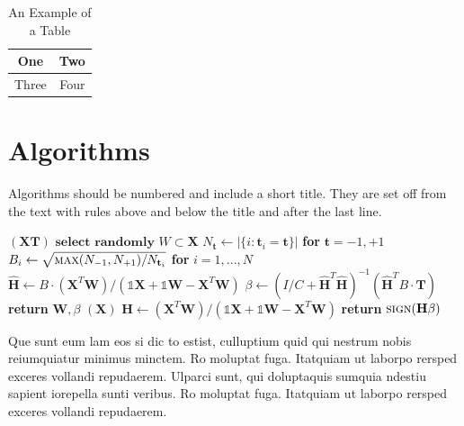 \documentclass[lettersize,journal]{IEEEtran}
\begin{document}
\begin{table}[!t]
\caption{An Example of a Table\label{tab:table1}}
\centering
\begin{tabular}{|c||c|}
\hline
One & Two\\
\hline
Three & Four\\
\hline
\end{tabular}
\end{table}

\section{Algorithms}
Algorithms should be numbered and include a short title. They are set off from the text with rules above and below the title and after the last line.

\begin{algorithm}[H]
\caption{Weighted Tanimoto ELM.}\label{alg:alg1}
\begin{algorithmic}
\STATE
{}$(\mathbf{X} \mathbf{T})$
\STATE \hspace{0.5cm}$ \textbf{select randomly } W \subset \mathbf{X}  $
\STATE \hspace{0.5cm}$ N_\mathbf{t} \gets | \{ i : \mathbf{t}_i = \mathbf{t} \} | $ \textbf{ for } $ \mathbf{t}= -1,+1 $
\STATE \hspace{0.5cm}$ B_i \gets \sqrt{ \textsc{max}(N_{-1},N_{+1}) / N_{\mathbf{t}_i} } $ \textbf{ for } $ i = 1,...,N $
\STATE \hspace{0.5cm}$ \hat{\mathbf{H}} \gets  B \cdot (\mathbf{X}^T\textbf{W})/( \mathbb{1}\mathbf{X} + \mathbb{1}\textbf{W} - \mathbf{X}^T\textbf{W} ) $
\STATE \hspace{0.5cm}$ \beta \gets \left ( I/C + \hat{\mathbf{H}}^T\hat{\mathbf{H}} \right )^{-1}(\hat{\mathbf{H}}^T B\cdot \mathbf{T})  $
\STATE \hspace{0.5cm}\textbf{return}  $\textbf{W},  \beta $
\STATE
{}$(\mathbf{X} )$
\STATE \hspace{0.5cm}$ \mathbf{H} \gets  (\mathbf{X}^T\textbf{W} )/( \mathbb{1}\mathbf{X}  + \mathbb{1}\textbf{W}- \mathbf{X}^T\textbf{W}  ) $
\STATE \hspace{0.5cm}\textbf{return}  $\textsc{sign}( \mathbf{H} \beta )$
\end{algorithmic}
\label{alg1}
\end{algorithm}

Que sunt eum lam eos si dic to estist, culluptium quid qui nestrum nobis reiumquiatur minimus minctem. Ro moluptat fuga. Itatquiam ut laborpo rersped exceres vollandi repudaerem. Ulparci sunt, qui doluptaquis sumquia ndestiu sapient iorepella sunti veribus. Ro moluptat fuga. Itatquiam ut laborpo rersped exceres vollandi repudaerem.
\end{document}
